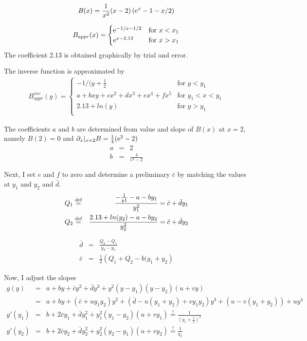 \documentclass[11pt,a4paper]{report}
\begin{document}
\begin{eqnarray}
B(x)=\frac{1}{x^2}(x-2)\left(\mathrm{e}^{x}-1-x/2\right)
\end{eqnarray}

\begin{eqnarray}
B_{appr}(x)=
\begin{cases}
\mathrm{e}^{-1/x-1/2} &\text{for $x<x_1$}\\
\mathrm{e}^{x-2.13} &\text{for $x>x_1$}\\
\end{cases}
\end{eqnarray}
The coefficient  2.13 is obtained graphically by trial and error.

The inverse function is approximated by
\begin{eqnarray}
B^{inv}_{appr}(y)=
\begin{cases}
-1/(y+\frac{1}{2} &\text{for $y<y_1$}\\
a+bxy+cx^2+dx^3+ex^4+fx^5 &\text{for $y_1<x<y_1$}\\
2.13+ln(y) &\text{for $y>y_1$}\\
\end{cases}
\end{eqnarray}

The coefficients $a$ and $b$ are determined from value and slope of
$B(x)$ at $x=2$, namely $B(2)=0$ and
$\partial_x|_{x=2}B=\frac{1}{4}(\mathrm{e}^{2}-2)$
\begin{eqnarray}
a&=&2
\nonumber\\
b&=&\frac{4}{e^2-2}
\end{eqnarray}

Next, I set $e$ and $f$ to zero and determine a preliminary $\bar{c}$
by matching the values at $y_1$ and $y_2$ and $\bar{d}$.
\begin{eqnarray}
Q_1&\stackrel{\text{def}}{=}&\frac{-\frac{1}{y1}-a-by_1}{y_1^2}=\bar{c}+\bar{d}y_1
\nonumber\\
Q_2&\stackrel{\text{def}}{=}& \frac{2.13+ln(y_2)-a-by_2}{y_2^2}=\bar{c}+\bar{d}y_2
\end{eqnarray}

\begin{eqnarray}
\bar{d}&=&\frac{Q_2-Q_1}{y_2-y_1}
\nonumber\\
\bar{c}&=&\frac{1}{2}\left(Q_1+Q_2-b(y_1+y_2\right)
\end{eqnarray}

Now, I adjust the slopes
\begin{eqnarray}
g(y)&=&a+by+\bar{c}y^2+\bar{d}y^3+ y^2(y-y_1)(y-y_2)(u+vy)
\nonumber\\
&=&a+by+\left(\bar{c}+uy_1y_2\right)y^2
+\left(\bar{d}-u(y_1+y_2)+vy_1y_2\right)y^3
+\left(u-v(y_1+y_2)\right)
+uy^4
\nonumber\\
g'(y_1)&=&b+2\bar{c}y_1+\bar{d}y_1^2+y_1^2(y_1-y_2)(u+vy_1)
\stackrel{!}=\frac{1}{(y_1+\frac{1}{2})^2}
\nonumber\\
g'(y_2)&=&b+2\bar{c}y_2+\bar{d}y_2^2+y_2^2(y_2-y_1)(u+vy_2)
\stackrel{!}=\frac{1}{y_2}
\end{eqnarray}
\end{document}
